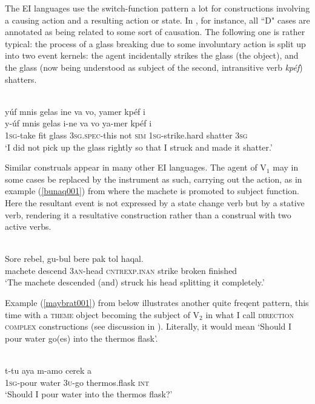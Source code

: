 The EI languages use the switch-function pattern a lot for constructions involving a causing action and a resulting action or state. In , for instance, all ``D" cases are annotated as being related to some sort of causation. The following one is rather typical: the process of a glass breaking due to some involuntary action is split up into two event kernels: the agent incidentally strikes the glass (the object), and the glass (now being understood as subject of the second, intransitive verb \textit{kpéf}) shatters.

\ea 
{}\\
\glll yúf mnis gelas ine va vo, yamer kpéf i \\
y-úf mnis gelas i-ne va vo ya-mer kpéf i \\
1\textsc{sg}-take fit glass 3\textsc{sg}.\textsc{spec}-this not \textsc{sim} 1\textsc{sg}-strike.hard shatter 3\textsc{sg} \\
\glft `I did not pick up the glass rightly so that I struck and made it shatter.'\\ 
\z

Similar construals appear in many other EI languages. The agent of V$_1$ may in some cases be replaced by the instrument as such, carrying out the action, as in example (\ref{bunaq001}) from  where the machete is promoted to subject function. Here the resultant event is not expressed by a state change verb but by a stative verb, rendering it a resultative construction rather than a construal with two active verbs.

\ea \label{bunaq001}
\\
\gll Sore rebel, gu-bul bere pak tol haqal. \\
machete descend 3\textsc{an}-head \textsc{cntrexp}.\textsc{inan} strike broken finished \\
\glft `The machete descended (and) struck his head splitting it completely.’\\ 
\z

Example (\ref{maybrat001}) from  below illustrates another quite freqent pattern, this time with a \textsc{theme} object becoming the subject of V$_2$ in what I call \textsc{direction complex} constructions (see discussion in ). Literally, it would mean `Should I pour water go(es) into the thermos flask'.

\ea \label{maybrat001}
\\
\gll t-tu aya m-amo cerek a \\
1\textsc{sg}-pour water 3\textsc{u}-go thermos.flask \textsc{int} \\
\glft `Should I pour water into the thermos flask?'\\ 
\z

